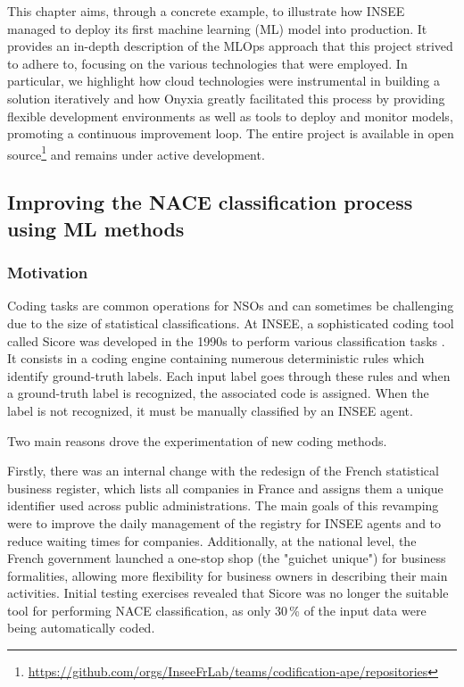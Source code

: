 \documentclass[graybox]{svmult}
\begin{document}
This chapter aims, through a concrete example, to illustrate how INSEE managed to deploy its first machine learning (ML) model into production. It provides an in-depth description of the MLOps approach that this project strived to adhere to, focusing on the various technologies that were employed. In particular, we highlight how cloud technologies were instrumental in building a solution iteratively and how Onyxia greatly facilitated this process by providing flexible development environments as well as tools to deploy and monitor models, promoting a continuous improvement loop. The entire project is available in open source\footnote{\url{https://github.com/orgs/InseeFrLab/teams/codification-ape/repositories}} and remains under active development.






\subsection{Improving the NACE classification process using ML methods}

\subsubsection{Motivation}

Coding tasks are common operations for NSOs and can sometimes be challenging due to the size of statistical classifications. At INSEE, a sophisticated coding tool called Sicore was developed in the 1990s to perform various classification tasks \citep{meyer_sicore_1997}. It consists in a coding engine containing numerous deterministic rules which identify ground-truth labels. Each input label goes through these rules and when a ground-truth label is recognized, the associated code is assigned. When the label is not recognized, it must be manually classified by an INSEE agent. 

Two main reasons drove the experimentation of new coding methods. 

Firstly, there was an internal change with the redesign of the French statistical business register, which lists all companies in France and assigns them a unique identifier used across public administrations. The main goals of this revamping were to improve the daily management of the registry for INSEE agents and to reduce waiting times for companies. Additionally, at the national level, the French government launched a one-stop shop (the "guichet unique") for business formalities, allowing more flexibility for business owners in describing their main activities. Initial testing exercises revealed that Sicore was no longer the suitable tool for performing NACE classification, as only 30\,\% of the input data were being automatically coded.
\end{document}
